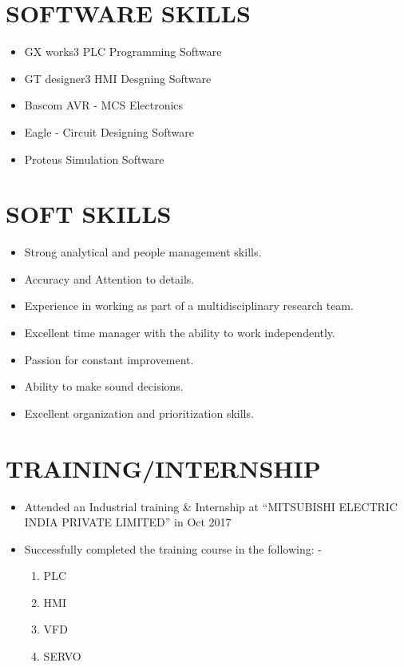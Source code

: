 \documentclass{res}
\begin{document}
\begin{resume}
\begin{itemize}
\end{itemize}   

\section{SOFTWARE SKILLS}
\begin{itemize}
\item GX works3 PLC Programming Software
\item GT designer3 HMI Desgning Software
\item Bascom AVR - MCS Electronics
\item Eagle - Circuit Designing Software
\item Proteus Simulation Software
\end {itemize}


\section{SOFT SKILLS}          
    \begin{itemize} \itemsep -2pt  %
\item Strong analytical and people management skills.
\item Accuracy and Attention to details. 
\item Experience in working as part of a multidisciplinary research team.
\item Excellent time manager with the ability to work independently.
\item Passion for constant improvement.
\item Ability to make sound decisions.
\item Excellent organization and prioritization skills.
 \end{itemize}

\section{TRAINING/INTERNSHIP}          
\begin{itemize} \itemsep -2pt  %
\item Attended an Industrial training \& Internship at “MITSUBISHI ELECTRIC INDIA PRIVATE LIMITED” in Oct 2017             
 \item Successfully completed the training course in the following: -
\begin{enumerate}
\item PLC
\item HMI
\item VFD
\item SERVO                
\end{enumerate}
\end{itemize}


\end{resume}
\end{document}
